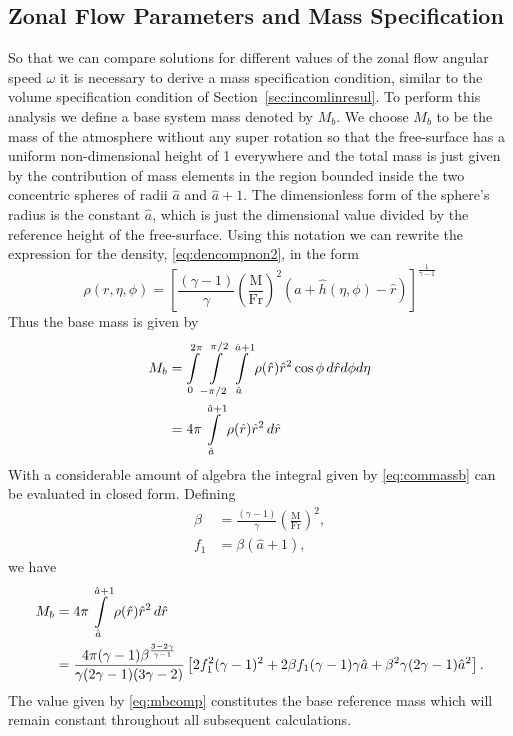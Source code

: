 \subsection{Zonal Flow Parameters and Mass Specification}
\label{subsec:massspec}
So that we can compare solutions for different values of the zonal flow angular speed $\omega$ it is necessary to derive a mass specification condition, similar to the volume specification condition of Section~\ref{sec:incomlinresul}. To perform this analysis we define a base system mass denoted by $M_b$. We choose $M_b$ to be the mass of the atmosphere without any super rotation so that the free-surface has a uniform non-dimensional height of 1 everywhere and the total mass is just given by the contribution of mass elements in the region bounded inside the two concentric spheres of radii $\hat{a}$ and $\hat{a}+1$. The dimensionless form of the sphere's radius is the constant $\hat{a}$, which is just the dimensional value divided by the reference height of the free-surface. Using this notation we can rewrite the expression for the density, \eqref{eq:dencompnon2}, in the form
\begin{equation}
\rho(r,\eta,\phi) =\left[\frac{(\gamma-1)}{\gamma}\left( \frac{\mbox{M}}{\mbox{Fr}}\right)^2 \left(\hat{a}+\hat{h}(\eta,\phi)-\hat{r}\right) \right]^{\frac{1}{\gamma-1}} \label{eq:dencompnon3}
\end{equation}
Thus the base mass is given by
\begin{align}
M_b&=\int\limits_0^{2\pi} \int\limits_{-\pi/2}^{\pi/2} \int\limits_{\hat{a}}^{\hat{a}+1} \rho(\hat{r})\hat{r}^2 \cos\phi\,d\hat{r} d\phi d\eta \notag  \\
&=4\pi \int\limits_{\hat{a}}^{\hat{a}+1} \rho(\hat{r})\hat{r}^2\,d\hat{r} \label{eq:commassb}
\end{align}
With a considerable amount of algebra the integral given by \eqref{eq:commassb} can be evaluated in closed form. Defining 
\begin{align}
\beta &= \frac{(\gamma-1)}{\gamma} \left(\frac{\mathrm{M}}{\mathrm{Fr}} \right)^2, \\
f_1 &= \beta(\hat{a}+1),
\end{align}
we have
\begin{align}
M_b &= 4\pi \int\limits_{\hat{a}}^{\hat{a}+1} \rho(\hat{r})\hat{r}^2\,d\hat{r} \notag\\
&= \frac{4\pi (\gamma-1)\beta^{\frac{3-2\gamma}{\gamma-1}}}{\gamma(2\gamma-1)(3\gamma-2)}\left[2f_1^2(\gamma-1)^2 + 2\beta f_1 (\gamma-1)\gamma \hat{a} + \beta^2\gamma(2\gamma-1)\hat{a}^2 \right]. \label{eq:mbcomp}
\end{align}
The value given by \eqref{eq:mbcomp} constitutes the base reference mass which will remain constant throughout all subsequent calculations.

